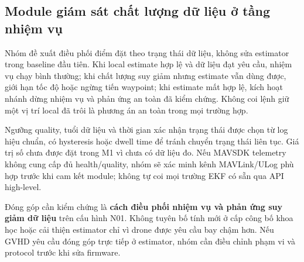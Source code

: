 \documentclass[a4paper,12pt]{article}
\begin{document}
\begin{center}
\label{fig:architecture}
\end{center}

\subsection{Module giám sát chất lượng dữ liệu ở tầng nhiệm vụ}
Nhóm đề xuất điều phối điểm đặt theo trạng thái dữ liệu, không sửa estimator trong baseline đầu tiên. Khi local estimate hợp lệ và dữ liệu đạt yêu cầu, nhiệm vụ chạy bình thường; khi chất lượng suy giảm nhưng estimate vẫn dùng được, giới hạn tốc độ hoặc ngừng tiến waypoint; khi estimate mất hợp lệ, kích hoạt nhánh dừng nhiệm vụ và phản ứng an toàn đã kiểm chứng. Không coi lệnh giữ một vị trí local đã trôi là phương án an toàn trong mọi trường hợp.

Ngưỡng quality, tuổi dữ liệu và thời gian xác nhận trạng thái được chọn từ log hiệu chuẩn, có hysteresis hoặc dwell time để tránh chuyển trạng thái liên tục. Giá trị số chưa được đặt trong M1 vì chưa có dữ liệu đo. Nếu MAVSDK telemetry không cung cấp đủ health/quality, nhóm sẽ xác minh kênh MAVLink/ULog phù hợp trước khi cam kết module; không tự coi mọi trường EKF có sẵn qua API high-level.

Đóng góp cần kiểm chứng là \textbf{cách điều phối nhiệm vụ và phản ứng suy giảm dữ liệu} trên cấu hình N01. Không tuyên bố tính mới ở cấp công bố khoa học hoặc cải thiện estimator chỉ vì drone được yêu cầu bay chậm hơn. Nếu GVHD yêu cầu đóng góp trực tiếp ở estimator, nhóm cần điều chỉnh phạm vi và protocol trước khi sửa firmware.
\end{document}
